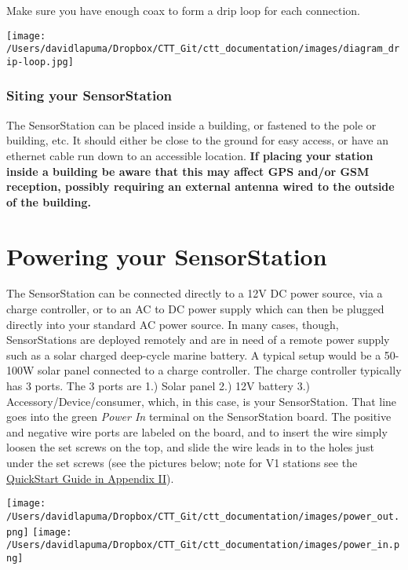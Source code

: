\documentclass[
]{article}
\begin{document}
Make sure you have enough coax to form a drip loop for each connection.

\texttt{[image: /Users/davidlapuma/Dropbox/CTT\_Git/ctt\_documentation/images/diagram\_drip-loop.jpg]}

\hypertarget{siting-your-sensorstation}{%
\subsubsection{Siting your
SensorStation}\label{siting-your-sensorstation}}

The SensorStation can be placed inside a building, or fastened to the
pole or building, etc. It should either be close to the ground for easy
access, or have an ethernet cable run down to an accessible location.
\textbf{If placing your station inside a building be aware that this may
affect GPS and/or GSM reception, possibly requiring an external antenna
wired to the outside of the building.}

\hypertarget{powering-your-sensorstation}{%
\section{Powering your
SensorStation}\label{powering-your-sensorstation}}

The SensorStation can be connected directly to a 12V DC power source,
via a charge controller, or to an AC to DC power supply which can then
be plugged directly into your standard AC power source. In many cases,
though, SensorStations are deployed remotely and are in need of a remote
power supply such as a solar charged deep-cycle marine battery. A
typical setup would be a 50-100W solar panel connected to a charge
controller. The charge controller typically has 3 ports. The 3 ports are
1.) Solar panel 2.) 12V battery 3.) Accessory/Device/consumer, which, in
this case, is your SensorStation. That line goes into the green
\emph{Power In} terminal on the SensorStation board. The positive and
negative wire ports are labeled on the board, and to insert the wire
simply loosen the set screws on the top, and slide the wire leads in to
the holes just under the set screws (see the pictures below; note for V1
stations see the \protect\hyperlink{V1Quickstart}{QuickStart Guide in
Appendix II}).

\texttt{[image: /Users/davidlapuma/Dropbox/CTT\_Git/ctt\_documentation/images/power\_out.png]}
\texttt{[image: /Users/davidlapuma/Dropbox/CTT\_Git/ctt\_documentation/images/power\_in.png]}
\end{document}
